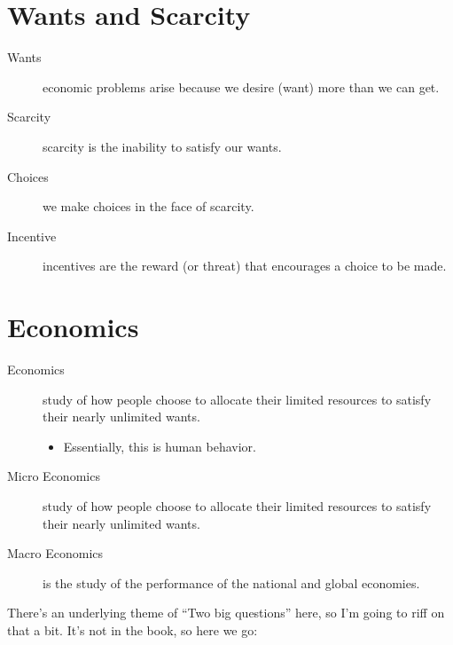             \section{Wants and Scarcity} %
            \label{sec:wants_and_scarcity}
                \begin{description}
                    \item[Wants] economic problems arise because we desire (want) more than we can get.
                    \item[Scarcity] scarcity is the inability to satisfy our wants.
                    \item[Choices] we make choices in the face of scarcity.
                    \item[Incentive] incentives are the reward (or threat) that encourages a choice to be made.
                \end{description}

            \section{Economics} %
            \label{sec:economics}
                \begin{description}
                    \item[Economics] study of how people choose to allocate their limited resources to satisfy their nearly unlimited wants.
                        \begin{itemize}
                            \item Essentially, this is human behavior.
                        \end{itemize}
                    \item[Micro Economics] study of how people choose to allocate their limited resources to satisfy their nearly unlimited wants.
                    \item[Macro Economics] is the study of the performance of the national and global economies.
                \end{description}

            There's an underlying theme of ``Two big questions'' here, so I'm going to riff on that a bit.
            It's not in the book, so here we go:

